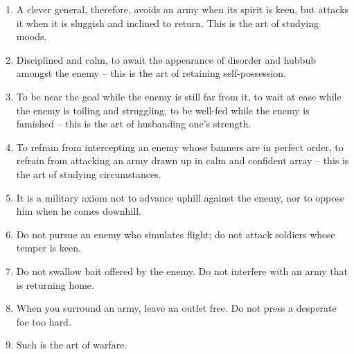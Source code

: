 \documentclass[oneside]{book}
\begin{document}
\begin{enumerate}
	\item A clever general, therefore, avoids an army when its spirit is keen, but attacks it when it is sluggish and inclined to return. This is the art of studying moods.
	\item Disciplined and calm, to await the appearance of disorder and hubbub amongst the enemy – this is the art of retaining self-possession.
	\item To be near the goal while the enemy is still far from it, to wait at ease while the enemy is toiling and struggling, to be well-fed while the enemy is famished – this is the art of husbanding one's strength.
	\item To refrain from intercepting an enemy whose banners are in perfect order, to refrain from attacking an army drawn up in calm and confident array – this is the art of studying circumstances.
	\item It is a military axiom not to advance uphill against the enemy, nor to oppose him when he comes downhill.
	\item Do not pursue an enemy who simulates flight; do not attack soldiers whose temper is keen.
	\item Do not swallow bait offered by the enemy. Do not interfere with an army that is returning home.
	\item When you surround an army, leave an outlet free. Do not press a desperate foe too hard.
	\item Such is the art of warfare.
\end{enumerate}
\end{document}

